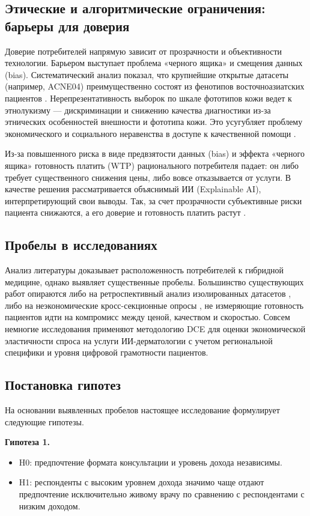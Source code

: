 \documentclass[12pt, a4paper]{article}
\begin{document}
\subsection{Этические и алгоритмические ограничения: барьеры для доверия}
Доверие потребителей напрямую зависит от прозрачности и объективности технологии. Барьером выступает проблема «черного ящика» и смещения данных (bias). Систематический анализ показал, что крупнейшие открытые датасеты (например, ACNE04) преимущественно состоят из фенотипов восточноазиатских пациентов \cite{Traini2025}. Нерепрезентативность выборок по шкале фототипов кожи ведет к этнолукизму — дискриминации и снижению качества диагностики из-за этнических особенностей внешности и фототипа кожи. Это усугубляет проблему экономического и социального неравенства в доступе к качественной помощи \cite{Artsrouni2025}.

Из-за повышенного риска в виде предвзятости данных (bias) и эффекта «черного ящика» готовность платить (WTP) рационального потребителя падает: он либо требует существенного снижения цены, либо вовсе отказывается от услуги. В качестве решения рассматривается объяснимый ИИ (Explainable AI), интерпретирующий свои выводы. Так, за счет прозрачности субъективные риски пациента снижаются, а его доверие и готовность платить растут \cite{Myzrova2024, Jagemann2024}.

\subsection{Пробелы в исследованиях}
Анализ литературы доказывает расположенность потребителей к гибридной медицине, однако выявляет существенные пробелы. Большинство существующих работ опираются либо на ретроспективный анализ изолированных датасетов \cite{Traini2025}, либо на неэкономические кросс-секционные опросы \cite{Jutzi2020, Shen2020}, не измеряющие готовность пациентов идти на компромисс между ценой, качеством и скоростью. Совсем немногие исследования применяют методологию DCE для оценки экономической эластичности спроса на услуги ИИ-дерматологии с учетом региональной специфики и уровня цифровой грамотности пациентов.

\subsection{Постановка гипотез}
На основании выявленных пробелов настоящее исследование формулирует следующие гипотезы.

\textbf{Гипотеза 1.}
\begin{itemize}
    \item H0: предпочтение формата консультации и уровень дохода независимы.
    \item H1: респонденты с высоким уровнем дохода значимо чаще отдают предпочтение исключительно живому врачу по сравнению с респондентами с низким доходом.
\end{itemize}
\end{document}
